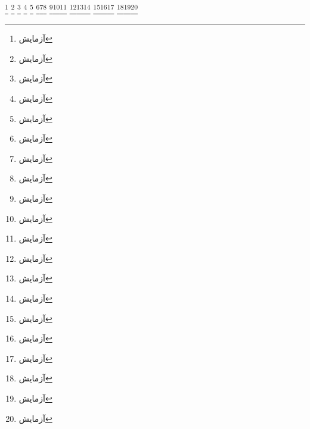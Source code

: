 \documentclass{article}
\begin{document}
\footnote{آزمایش}%
\footnote{آزمایش}%
\footnote{آزمایش}%
\footnote{آزمایش}%
\footnote{آزمایش}%
\newpage
\RTLcolumnfootnotes
\footnote{آزمایش}\footnote{آزمایش}\footnote{آزمایش}%
\footnote{آزمایش}\footnote{آزمایش}\footnote{آزمایش}%
\footnote{آزمایش}\footnote{آزمایش}\footnote{آزمایش}%
\footnote{آزمایش}\footnote{آزمایش}\footnote{آزمایش}%
\footnote{آزمایش}\footnote{آزمایش}\footnote{آزمایش}%
\end{document}
